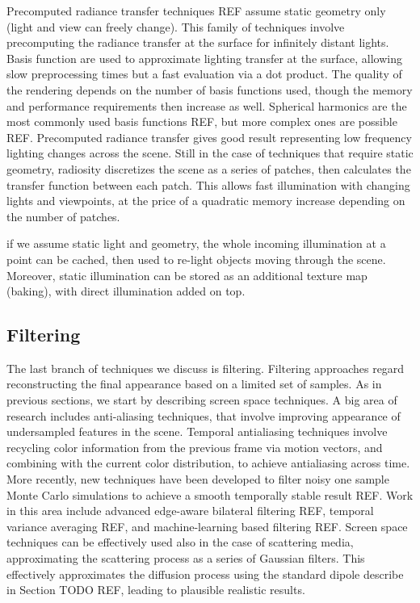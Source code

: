 Precomputed radiance transfer techniques REF assume static geometry only (light and view can freely change). This family of techniques involve precomputing the radiance transfer at the surface for infinitely distant lights. Basis function are used to approximate lighting transfer at the surface, allowing slow preprocessing times but a fast evaluation via a dot product. The quality of the rendering depends on the number of basis functions used, though the memory and performance requirements then increase as well. Spherical harmonics are the most commonly used basis functions REF, but more complex ones are possible REF. Precomputed radiance transfer gives good result representing low frequency lighting changes across the scene. Still in the case of techniques that require static geometry, radiosity discretizes the scene as a series of patches, then calculates the transfer function between each patch. This allows fast illumination with changing lights and viewpoints, at the price of a quadratic memory increase depending on the number of patches. 

if we assume static light and geometry, the whole incoming illumination at a point can be cached, then used to re-light objects moving through the scene. Moreover, static illumination can be stored as an additional texture map (baking), with direct illumination added on top. 

\subsection{Filtering}

The last branch of techniques we discuss is filtering. Filtering approaches regard reconstructing the final appearance based on a limited set of samples. As in previous sections, we start by describing screen space techniques. A big area of research includes anti-aliasing techniques, that involve improving appearance of undersampled features in the scene. Temporal antialiasing techniques involve recycling color information from the previous frame via motion vectors, and combining with the current color distribution, to achieve antialiasing across time. More recently, new techniques have been developed to filter noisy one sample Monte Carlo simulations to achieve a smooth temporally stable result REF. Work in this area include advanced edge-aware bilateral filtering REF, temporal variance averaging REF, and machine-learning based filtering REF. Screen space techniques can be effectively used also in the case of scattering media, approximating the scattering process as a series of Gaussian filters. This effectively approximates the diffusion process using the standard dipole describe in Section TODO REF, leading to plausible realistic results. 

